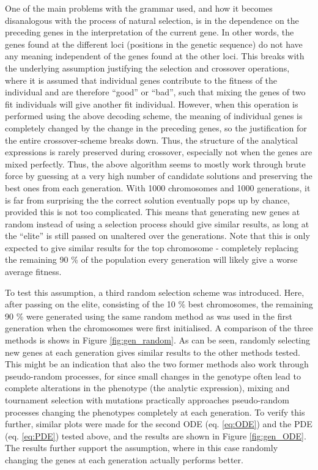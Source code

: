 \documentclass[multicolumn, 10pt]{extarticle}
\begin{document}
One of the main problems with the grammar used, and how it becomes disanalogous with the process of natural selection, is in the dependence on the preceding genes in the interpretation of the current gene. In other words, the genes found at the different loci (positions in the genetic sequence) do not have any meaning independent of the genes found at the other loci. This breaks with the underlying assumption justifying the selection and crossover operations, where it is assumed that individual genes contribute to the fitness of the individual and are therefore ``good'' or ``bad'', such that mixing the genes of two fit individuals will give another fit individual. However, when this operation is performed using the above decoding scheme, the meaning of individual genes is completely changed by the change in the preceding genes, so the justification for the entire crossover-scheme breaks down. Thus, the structure of the analytical expressions is rarely preserved during crossover, especially not when the genes are mixed perfectly. Thus, the above algorithm seems to mostly work through brute force by guessing at a very high number of candidate solutions and preserving the best ones from each generation. With 1000 chromosomes and 1000 generations, it is far from surprising the the correct solution eventually pops up by chance, provided this is not too complicated. This means that generating new genes at random instead of using a selection process should give similar results, as long at the ``elite'' is still passed on unaltered over the generations. Note that this is only expected to give similar results for the top chromosome - completely replacing the remaining 90 \% of the population every generation will likely give a worse average fitness.

To test this assumption, a third random selection scheme was introduced. Here, after passing on the elite, consisting of the 10 \% best chromosomes, the remaining 90 \% were generated using the same random method as was used in the first generation when the chromosomes were first initialised. A comparison of the three methods is shows in Figure \ref{fig:gen_random}. As can be seen, randomly selecting new genes at each generation gives similar results to the other methods tested. This might be an indication that also the two former methods also work through pseudo-random processes, for since small changes in the genotype often lead to complete alterations in the phenotype (the analytic expression), mixing and tournament selection with mutations practically approaches pseudo-random processes changing the phenotypes completely at each generation. To verify this further, similar plots were made for the second ODE (eq. \eqref{eq:ODE}) and the PDE (eq. \eqref{eq:PDE}) tested above, and the results are shown in Figure \ref{fig:gen_ODE}. The results further support the assumption, where in this case randomly changing the genes at each generation actually performs better.
\end{document}
